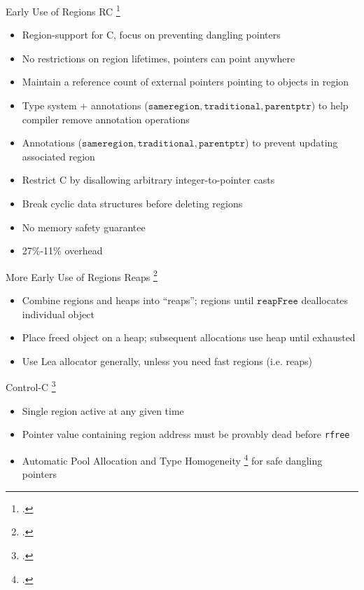 \documentclass[aspectratio=169]{beamer}
\begin{document}
\begin{frame}{Early Use of Regions}
\footnotesize
RC \footcite{gay_language_2001}
    \vspace{-0.1in}
   \begin{itemize}
     \item Region-support for C, focus on preventing dangling pointers %
     \item No restrictions on region lifetimes, pointers can point anywhere
     \item Maintain a reference count of external pointers pointing to objects in region %
     \item Type system + annotations ($\texttt{sameregion}, \texttt{traditional}, \texttt{parentptr}$) to help compiler remove annotation operations %
     \item Annotations ($\texttt{sameregion}, \texttt{traditional}, \texttt{parentptr}$) to prevent updating associated region %
     \item Restrict C by disallowing arbitrary integer-to-pointer casts
     \item Break cyclic data structures before deleting regions
     \item \alert{No} memory safety guarantee
     \item 27\%-11\% overhead
   \end{itemize}
\end{frame}

\begin{frame}{More Early Use of Regions}
Reaps \footcite{berger_reconsidering_2002}
    \vspace{-0.1in}
   \begin{itemize}
     \item Combine regions and heaps into ``reaps''; regions until $\texttt{reapFree}$ deallocates individual object
     \item Place freed object on a heap; subsequent allocations use heap until exhausted
     \item Use Lea allocator generally, unless you need fast regions (i.e. reaps) %
   \end{itemize}

Control-C \footcite{kowshik_ensuring_2002}
    \vspace{-0.1in}
    \begin{itemize}
        \item Single region active at any given time
        \item Pointer value containing region address must be provably dead before \texttt{rfree}
        \item Automatic Pool Allocation and Type Homogeneity \footcite{dhurjati_memory_2003} for safe dangling pointers 
    \end{itemize}
\end{frame}
\end{document}
